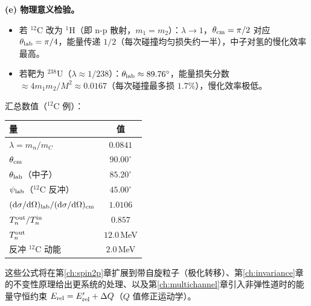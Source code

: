 \begin{example}
\textbf{(e) 物理意义检验。}
\begin{itemize}
  \item 若 $^{12}$C 改为 $^{1}$H（即 n-p 散射，$m_1=m_2$）：$\lambda\to 1$，$\theta_{\rm cm}=\pi/2$ 对应 $\theta_{\rm lab}=\pi/4$，能量传递 $1/2$（每次碰撞均匀损失约一半），中子对氢的慢化效率最高。
  \item 若靶为 $^{238}$U（$\lambda\approx 1/238$）：$\theta_{\rm lab}\approx 89.76^\circ$，能量损失分数 $\approx 4 m_1 m_2/M^2\approx 0.0167$（每次碰撞最多损 $1.7\%$），慢化效率极低。
\end{itemize}
\end{example}

汇总数值（$^{12}$C 例）：
\begin{center}
\begin{tabular}{lc}
  \hline
  量 & 值\\
  \hline
  $\lambda=m_n/m_C$ & $0.0841$ \\
  $\theta_{\rm cm}$ & $90.00^\circ$ \\
  $\theta_{\rm lab}$（中子） & $85.20^\circ$ \\
  $\psi_{\rm lab}$（$^{12}$C 反冲） & $45.00^\circ$ \\
  $(\mathrm{d}\sigma/\mathrm{d}\Omega)_{\rm lab}/(\mathrm{d}\sigma/\mathrm{d}\Omega)_{\rm cm}$ & $1.0106$ \\
  $T_n^{\rm out}/T_n^{\rm in}$ & $0.857$ \\
  $T_n^{\rm out}$ & $12.0$\,MeV \\
  反冲 $^{12}$C 动能 & $2.0$\,MeV \\
  \hline
\end{tabular}
\end{center}

\begin{remark}
  这些公式将在第\ref{ch:spin2p}章扩展到带自旋粒子（极化转移）、第\ref{ch:invariance}章的不变性原理给出更系统的处理、以及第\ref{ch:multichannel}章引入非弹性道时的能量守恒约束 $E_{\rm rel}=E_{\rm rel}'+\Delta Q$（$Q$ 值修正运动学）。
\end{remark}
